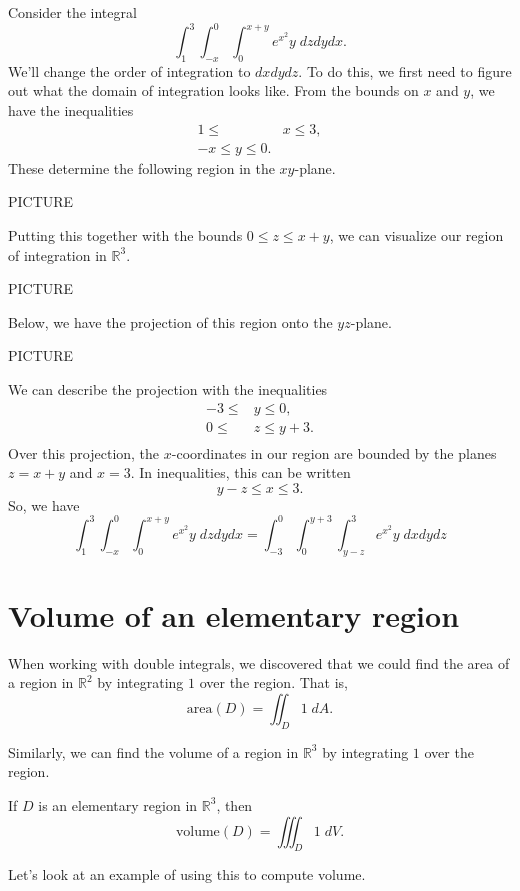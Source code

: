 \documentclass{ximera}
\begin{document}
\begin{example}
Consider the integral
\[
\int_1^3\int_{-x}^0\int_0^{x+y} e^{x^2}y\;dzdydx.
\]
We'll change the order of integration to $dxdydz$. To do this, we first need to figure out what the domain of integration looks like. From the bounds on $x$ and $y$, we have the inequalities
\begin{align*}
1\leq &x\leq 3,\\
-x\leq y\leq 0.
\end{align*}
These determine the following region in the $xy$-plane.

PICTURE

Putting this together with the bounds $0\leq z\leq x+y$, we can visualize our region of integration in $\mathbb{R}^3$.

PICTURE

Below, we have the projection of this region onto the $yz$-plane.

PICTURE

We can describe the projection with the inequalities
\begin{align*}
-3\leq &y\leq 0,\\
0\leq &z\leq y+3.\\
\end{align*}
Over this projection, the $x$-coordinates in our region are bounded by the planes $z=x+y$ and $x=3$. In inequalities, this can be written
\[
y-z\leq x\leq 3.
\]
So, we have
\[
\int_1^3\int_{-x}^0\int_0^{x+y} e^{x^2}y\;dzdydx = \int_{-3}^0\int_0^{y+3}\int_{y-z}^3 e^{x^2}y\;dxdydz
\]

\end{example}

\section*{Volume of an elementary region}

When working with double integrals, we discovered that we could find the area of a region in $\mathbb{R}^2$ by integrating $1$ over the region. That is,
\[
\text{area}(D) = \iint_D 1\;dA.
\]

Similarly, we can find the volume of a region in $\mathbb{R}^3$ by integrating $1$ over the region.

\begin{proposition}
If $D$ is an elementary region in $\mathbb{R}^3$, then
\[
\text{volume}(D) = \iiint_D 1\;dV.
\]
\end{proposition}

Let's look at an example of using this to compute volume.
\end{document}
